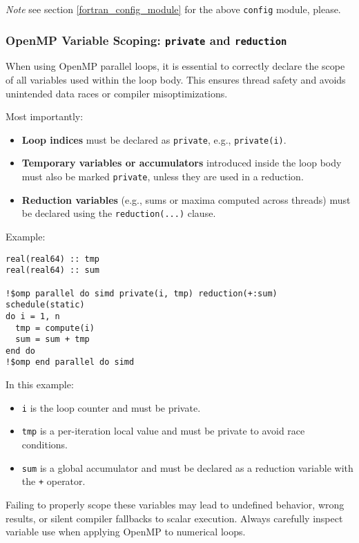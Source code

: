 \documentclass{article}
\begin{document}
\emph{Note} see section \ref{fortran_config_module} for the above
\texttt{config} module, please.

\subsubsection{OpenMP Variable Scoping: \texttt{private} and \texttt{reduction}}

When using OpenMP parallel loops, it is essential to correctly declare the scope of all variables used within the loop body. This ensures thread safety and avoids unintended data races or compiler misoptimizations.

Most importantly:

\begin{itemize}
  \item \textbf{Loop indices} must be declared as \texttt{private}, e.g., \texttt{private(i)}.
  \item \textbf{Temporary variables or accumulators} introduced inside the loop body must also be marked \texttt{private}, unless they are used in a reduction.
  \item \textbf{Reduction variables} (e.g., sums or maxima computed across threads) must be declared using the \texttt{reduction(...)} clause.
\end{itemize}

\noindent
Example:
\begin{verbatim}
real(real64) :: tmp
real(real64) :: sum

!$omp parallel do simd private(i, tmp) reduction(+:sum) schedule(static)
do i = 1, n
  tmp = compute(i)
  sum = sum + tmp
end do
!$omp end parallel do simd
\end{verbatim}

In this example:
\begin{itemize}
  \item \texttt{i} is the loop counter and must be private.
  \item \texttt{tmp} is a per-iteration local value and must be private to avoid race conditions.
  \item \texttt{sum} is a global accumulator and must be declared as a reduction variable with the \texttt{+} operator.
\end{itemize}

Failing to properly scope these variables may lead to undefined behavior, wrong results, or silent compiler fallbacks to scalar execution. Always carefully inspect variable use when applying OpenMP to numerical loops.
\end{document}
